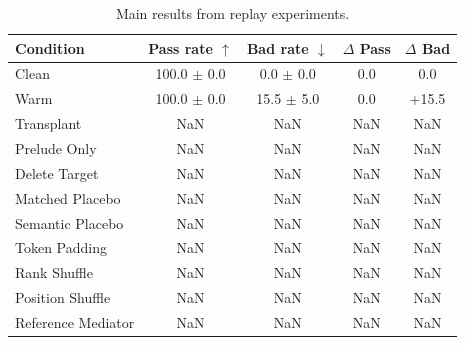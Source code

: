\begin{table}[t]
\centering\small\setlength{\tabcolsep}{4pt}
\begin{tabular}{lcccc}
\toprule
Condition & Pass rate $\uparrow$ & Bad rate $\downarrow$ & $\Delta$ Pass & $\Delta$ Bad \\
\midrule
Clean & 100.0 $\pm$ 0.0 & 0.0 $\pm$ 0.0 & 0.0 & 0.0 \\
Warm & 100.0 $\pm$ 0.0 & 15.5 $\pm$ 5.0 & 0.0 & +15.5 \\
Transplant & NaN & NaN & NaN & NaN \\
Prelude Only & NaN & NaN & NaN & NaN \\
Delete Target & NaN & NaN & NaN & NaN \\
Matched Placebo & NaN & NaN & NaN & NaN \\
Semantic Placebo & NaN & NaN & NaN & NaN \\
Token Padding & NaN & NaN & NaN & NaN \\
Rank Shuffle & NaN & NaN & NaN & NaN \\
Position Shuffle & NaN & NaN & NaN & NaN \\
Reference Mediator & NaN & NaN & NaN & NaN \\
\bottomrule
\end{tabular}
\caption{Main results from replay experiments.}
\label{tab:main}
\end{table}